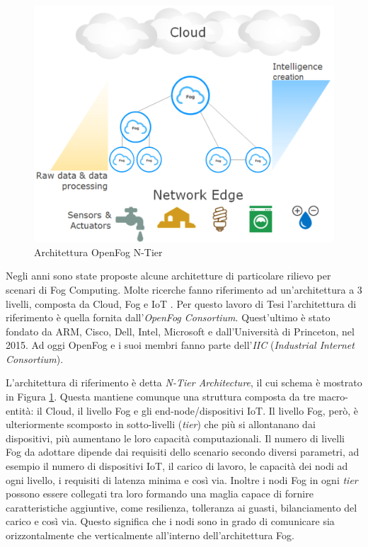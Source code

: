 \begin{figure}[!ht]
  \includegraphics[width=12cm]{images/FogCloudToThingContinuum}
  \centering
  \caption[Architettura OpenFog N-Tier]{Architettura OpenFog N-Tier \cite{OpenFogReferenceArchitecture}}
  \label{fig:ntier_architecture}
\end{figure}

Negli anni sono state proposte alcune architetture di particolare rilievo per scenari di Fog Computing. Molte ricerche fanno riferimento ad un'architettura a 3 livelli, composta da Cloud, Fog e IoT \cite{ThreeLevelArchitecture}. Per questo lavoro di Tesi l'architettura di riferimento è quella fornita dall'\textit{OpenFog Consortium}. Quest'ultimo è stato fondato da ARM, Cisco, Dell, Intel, Microsoft e dall'Università di Princeton, nel 2015. Ad oggi OpenFog e i suoi membri fanno parte dell'\textit{IIC} (\textit{Industrial Internet Consortium}). 

L'architettura di riferimento è detta \textit{N-Tier Architecture}, il cui schema è mostrato in Figura \ref{fig:ntier_architecture}. Questa mantiene comunque una struttura composta da tre macro-entità: il Cloud, il livello Fog e gli end-node/dispositivi IoT. Il livello Fog, però, è ulteriormente scomposto in sotto-livelli (\textit{tier}) che più si allontanano dai dispositivi, più aumentano le loro capacità computazionali. Il numero di livelli Fog da adottare dipende dai requisiti dello scenario secondo diversi parametri, ad esempio il numero di dispositivi IoT, il carico di lavoro, le capacità dei nodi ad ogni livello, i requisiti di latenza minima e così via. Inoltre i nodi Fog in ogni \textit{tier} possono essere collegati tra loro formando una maglia capace di fornire caratteristiche aggiuntive, come resilienza, tolleranza ai guasti, bilanciamento del carico e così via. Questo significa che i nodi sono in grado di comunicare sia orizzontalmente che verticalmente all'interno dell'architettura Fog.

